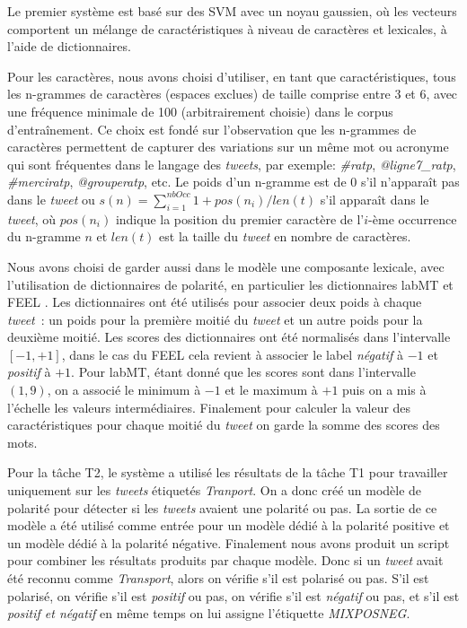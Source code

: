
Le premier système est basé sur des SVM avec un noyau gaussien, où les vecteurs comportent un mélange de caractéristiques à niveau de caractères et lexicales, à l'aide de dictionnaires.

Pour les caractères, nous avons choisi d'utiliser, en tant que caractéristiques, tous les n-grammes de caractères (espaces exclues) de taille comprise entre 3 et 6, avec une fréquence minimale de 100 (arbitrairement choisie) dans le corpus d’entraînement.
Ce choix est fondé sur l'observation que les n-grammes de caractères permettent de capturer des variations sur un même mot ou acronyme qui sont fréquentes dans le langage des \textit{tweets}, par exemple: \emph{\#ratp}, \emph{@ligne7\_ratp}, \emph{\#merciratp}, \emph{@grouperatp}, etc.
Le poids d'un n-gramme est de 0 s'il n'apparaît pas dans le \textit{tweet} ou $s(n)= \sum_{i=1}^{nbOcc} 1 + pos(n_i)/len(t)$ s'il apparaît dans le \textit{tweet}, où $pos(n_i)$ indique la position du premier caractère de l'$i$-ème occurrence du n-gramme $n$ et $len(t)$ est la taille du \textit{tweet} en nombre de caractères.

Nous avons choisi de garder aussi dans le modèle une composante lexicale, avec l'utilisation de dictionnaires de polarité, en particulier les dictionnaires labMT \cite{dodds2011} et FEEL \cite{abdaoui2017}.
Les dictionnaires ont été utilisés pour associer deux poids à chaque \textit{tweet}~: un poids pour la première moitié du \textit{tweet} et un autre poids pour la deuxième moitié.
Les scores des dictionnaires ont été normalisés dans l'intervalle $[-1, +1]$, dans le cas du FEEL cela revient à associer le label \emph{négatif} à $-1$ et \emph{positif} à $+1$.
Pour labMT, étant donné que les scores sont dans l'intervalle $(1,9)$, on a associé le minimum à $-1$ et le maximum à $+1$ puis on a mis à l'échelle les valeurs intermédiaires. Finalement pour calculer la valeur des caractéristiques pour chaque moitié du \textit{tweet} on garde la somme des scores des mots.

Pour la tâche T2, le système a utilisé les résultats de la tâche T1 pour travailler uniquement sur les \textit{tweets} étiquetés \emph{Tranport}.
On a donc créé un modèle de polarité pour détecter si les \textit{tweets} avaient une polarité ou pas.
La sortie de ce modèle a été utilisé comme entrée pour un modèle dédié à la polarité positive et un modèle dédié à la polarité négative.
Finalement nous avons produit un script pour combiner les résultats produits par chaque modèle.
Donc si un \textit{tweet} avait été reconnu comme \emph{Transport}, alors on vérifie s'il est polarisé ou pas.
S'il est polarisé, on vérifie s'il est \emph{positif} ou pas, on vérifie s'il est \emph{négatif} ou pas, et s'il est \emph{positif et négatif} en même temps on lui assigne l'étiquette \emph{MIXPOSNEG}.

